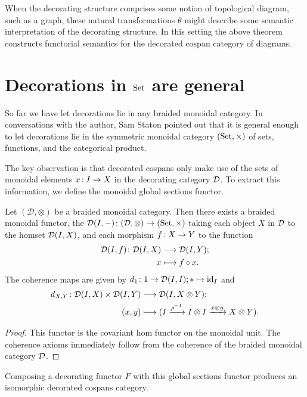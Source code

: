 When the decorating structure comprises some notion of topological diagram, such
as a graph, these natural transformations $\theta$ might describe some semantic
interpretation of the decorating structure. In this setting the above theorem
constructs functorial semantics for the decorated cospan category of diagrams.

\section{Decorations in $\mathrm{Set}$ are general}

So far we have let decorations lie in any braided monoidal category. In
conversations with the author, Sam Staton pointed out that it is general enough
to let decorations lie in the symmetric monoidal category $(\mathrm{Set},\times)$ of
sets, functions, and the categorical product.

The key observation is that decorated cospans only make use of the sets of
monoidal elements $x{\colon} I \to X$ in the decorating category $\mathcal D$. To
extract this information, we define the monoidal global sections functor.

\begin{proposition}
Let $(\mathcal D, \otimes)$ be a braided monoidal category. Then there exists a
braided monoidal functor, the 
$\mathcal D(I,-){\colon} (\mathcal D,\otimes) \to (\mathrm{Set},\times)$ taking each object $X$ in
$\mathcal D$ to the homset $\mathcal D(I,X)$, and each morphism $f{\colon} X \to Y$ to the
function 
\begin{align*}
  \mathcal D(I,f){\colon} \mathcal D(I,X) &\longrightarrow \mathcal D(I,Y); \\ 
  x &\longmapsto f \circ x.
\end{align*}
The coherence maps are given by $d_1{\colon} 1 \to \mathcal D(I,I);
\ast \mapsto \mathrm{id}_I$ and
\begin{align*}
  d_{X,Y} {\colon} \mathcal D(I,X) \times \mathcal D(I,Y) &\longrightarrow \mathcal D(I, X \otimes
  Y);\\
  (x,y) &\longmapsto (I \xrightarrow{\rho^{-1}} I \otimes I \xrightarrow{x \otimes y} X \otimes
  Y).
\end{align*}
\end{proposition}
\begin{proof}
  This functor is the covariant hom functor on the monoidal unit. The
  coherence axioms immediately follow from the coherence of the braided monoidal
  category $\mathcal D$.
\end{proof}

Composing a decorating functor $F$ with this global sections functor produces an
isomorphic decorated cospans category.

